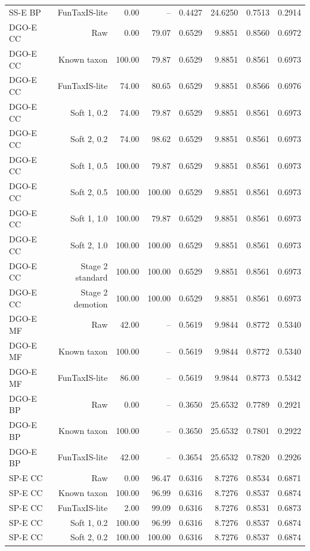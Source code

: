 \begin{longtable}{lrrrrrrr}
SS-E BP & FunTaxIS-lite & 0.00 & -- & 0.4427 & 24.6250 & 0.7513 & 0.2914 \\
DGO-E CC & Raw & 0.00 & 79.07 & 0.6529 & 9.8851 & 0.8560 & 0.6972 \\
DGO-E CC & Known taxon & 100.00 & 79.87 & 0.6529 & 9.8851 & 0.8561 & 0.6973 \\
DGO-E CC & FunTaxIS-lite & 74.00 & 80.65 & 0.6529 & 9.8851 & 0.8566 & 0.6976 \\
DGO-E CC & Soft 1, 0.2 & 74.00 & 79.87 & 0.6529 & 9.8851 & 0.8561 & 0.6973 \\
DGO-E CC & Soft 2, 0.2 & 74.00 & 98.62 & 0.6529 & 9.8851 & 0.8561 & 0.6973 \\
DGO-E CC & Soft 1, 0.5 & 100.00 & 79.87 & 0.6529 & 9.8851 & 0.8561 & 0.6973 \\
DGO-E CC & Soft 2, 0.5 & 100.00 & 100.00 & 0.6529 & 9.8851 & 0.8561 & 0.6973 \\
DGO-E CC & Soft 1, 1.0 & 100.00 & 79.87 & 0.6529 & 9.8851 & 0.8561 & 0.6973 \\
DGO-E CC & Soft 2, 1.0 & 100.00 & 100.00 & 0.6529 & 9.8851 & 0.8561 & 0.6973 \\
DGO-E CC & Stage 2 standard & 100.00 & 100.00 & 0.6529 & 9.8851 & 0.8561 & 0.6973 \\
DGO-E CC & Stage 2 demotion & 100.00 & 100.00 & 0.6529 & 9.8851 & 0.8561 & 0.6973 \\
DGO-E MF & Raw & 42.00 & -- & 0.5619 & 9.9844 & 0.8772 & 0.5340 \\
DGO-E MF & Known taxon & 100.00 & -- & 0.5619 & 9.9844 & 0.8772 & 0.5340 \\
DGO-E MF & FunTaxIS-lite & 86.00 & -- & 0.5619 & 9.9844 & 0.8773 & 0.5342 \\
DGO-E BP & Raw & 0.00 & -- & 0.3650 & 25.6532 & 0.7789 & 0.2921 \\
DGO-E BP & Known taxon & 100.00 & -- & 0.3650 & 25.6532 & 0.7801 & 0.2922 \\
DGO-E BP & FunTaxIS-lite & 42.00 & -- & 0.3654 & 25.6532 & 0.7820 & 0.2926 \\
SP-E CC & Raw & 0.00 & 96.47 & 0.6316 & 8.7276 & 0.8534 & 0.6871 \\
SP-E CC & Known taxon & 100.00 & 96.99 & 0.6316 & 8.7276 & 0.8537 & 0.6874 \\
SP-E CC & FunTaxIS-lite & 2.00 & 99.09 & 0.6316 & 8.7276 & 0.8531 & 0.6873 \\
SP-E CC & Soft 1, 0.2 & 100.00 & 96.99 & 0.6316 & 8.7276 & 0.8537 & 0.6874 \\
SP-E CC & Soft 2, 0.2 & 100.00 & 100.00 & 0.6316 & 8.7276 & 0.8537 & 0.6874 \\

\end{longtable}

